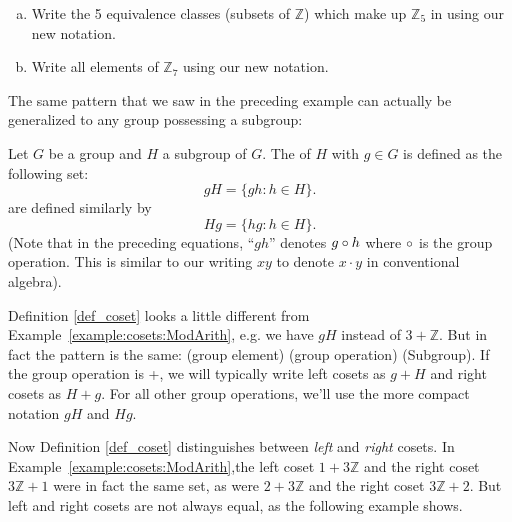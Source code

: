 \begin{exercise}{}
\begin{enumerate}[(a)]
\item
Write the 5 equivalence classes (subsets of ${\mathbb Z}$)  which make up ${\mathbb Z}_5$ in using our new notation.
\item
Write all elements of ${\mathbb Z}_7$ using our new notation.
\end{enumerate}
\end{exercise}

The same pattern that we saw in the preceding example can actually be generalized to any group possessing a subgroup:

\begin{defn}\label{def_coset}
Let $G$ be a group and $H$ a subgroup of $G$.  The  of $H$ with  $g \in G$ is defined as the following set: 
\[
gH = \{ gh : h \in H \}.
\]
 are defined similarly by
\[
Hg = \{ hg : h \in H \}.
\]
(Note that in the preceding equations, ``$gh$'' denotes $g \circ h$ where $\circ$ is the group operation. This is similar to our writing $xy$ to denote $x \cdot y$ in conventional algebra).
\end{defn}

Definition \ref{def_coset} looks a little different from Example~\ref{example:cosets:ModArith}, e.g. we have $gH$ instead of  $3 + {\mathbb Z}$.  But in fact the pattern is the same:  (group element) (group operation) (Subgroup).  If the group operation is +, we will typically write left cosets as $g + H$ and right cosets as $H + g$. For all other group operations, we'll use the more compact notation $gH$ and $Hg$.

Now Definition \ref{def_coset} distinguishes between  \emph{left} and \emph{right} cosets.   In Example~\ref{example:cosets:ModArith},the left coset $1 + 3{\mathbb Z}$ and the right coset $ 3{\mathbb Z} + 1$ were in fact the same set, as were $2 + 3{\mathbb Z}$ and the right coset $ 3{\mathbb Z} + 2$.  But left and right cosets are not always equal, as the following example shows.  

